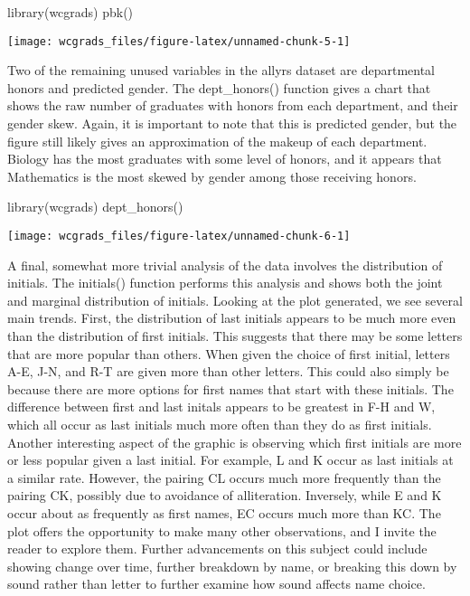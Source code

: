 \begin{Schunk}
\begin{Sinput}
library(wcgrads)
pbk()
\end{Sinput}

\texttt{[image: wcgrads\_files/figure-latex/unnamed-chunk-5-1]} \end{Schunk}

Two of the remaining unused variables in the allyrs dataset are
departmental honors and predicted gender. The dept\_honors() function
gives a chart that shows the raw number of graduates with honors from
each department, and their gender skew. Again, it is important to note
that this is predicted gender, but the figure still likely gives an
approximation of the makeup of each department. Biology has the most
graduates with some level of honors, and it appears that Mathematics is
the most skewed by gender among those receiving honors.

\begin{Schunk}
\begin{Sinput}
library(wcgrads)
dept_honors()
\end{Sinput}

\texttt{[image: wcgrads\_files/figure-latex/unnamed-chunk-6-1]} \end{Schunk}

A final, somewhat more trivial analysis of the data involves the
distribution of initials. The initials() function performs this analysis
and shows both the joint and marginal distribution of initials. Looking
at the plot generated, we see several main trends. First, the
distribution of last initials appears to be much more even than the
distribution of first initials. This suggests that there may be some
letters that are more popular than others. When given the choice of
first initial, letters A-E, J-N, and R-T are given more than other
letters. This could also simply be because there are more options for
first names that start with these initials. The difference between first
and last initals appears to be greatest in F-H and W, which all occur as
last initials much more often than they do as first initials. Another
interesting aspect of the graphic is observing which first initials are
more or less popular given a last initial. For example, L and K occur as
last initials at a similar rate. However, the pairing CL occurs much
more frequently than the pairing CK, possibly due to avoidance of
alliteration. Inversely, while E and K occur about as frequently as
first names, EC occurs much more than KC. The plot offers the
opportunity to make many other observations, and I invite the reader to
explore them. Further advancements on this subject could include showing
change over time, further breakdown by name, or breaking this down by
sound rather than letter to further examine how sound affects name
choice.

